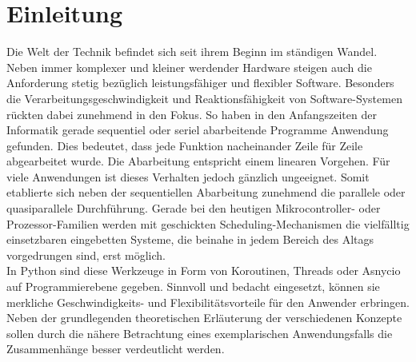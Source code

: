 \chapter{Einleitung}
\label{ch:intro}
Die Welt der Technik befindet sich seit ihrem Beginn im ständigen Wandel. Neben immer komplexer und kleiner werdender Hardware steigen auch die Anforderung stetig bezüglich leistungsfähiger und flexibler Software. Besonders die Verarbeitungsgeschwindigkeit und Reaktionsfähigkeit von Software-Systemen rückten dabei zunehmend in den Fokus. So haben in den Anfangszeiten der Informatik gerade sequentiel oder seriel abarbeitende Programme Anwendung gefunden. Dies bedeutet, dass jede Funktion nacheinander Zeile für Zeile abgearbeitet wurde. Die Abarbeitung entspricht einem linearen Vorgehen. Für viele Anwendungen ist dieses Verhalten jedoch gänzlich ungeeignet. Somit etablierte sich neben der sequentiellen Abarbeitung zunehmend die parallele oder quasiparallele Durchführung. Gerade bei den heutigen Mikrocontroller- oder Prozessor-Familien werden mit geschickten Scheduling-Mechanismen die vielfälltig einsetzbaren eingebetten Systeme, die beinahe in jedem Bereich des Altags vorgedrungen sind, erst möglich.\\
In Python sind diese Werkzeuge in Form von Koroutinen, Threads oder Asnycio auf Programmierebene gegeben. Sinnvoll und bedacht eingesetzt, können sie merkliche Geschwindigkeits- und Flexibilitätsvorteile für den Anwender erbringen.
Neben der grundlegenden theoretischen Erläuterung der verschiedenen Konzepte sollen durch die nähere Betrachtung eines exemplarischen Anwendungsfalls die Zusammenhänge besser verdeutlicht werden.
